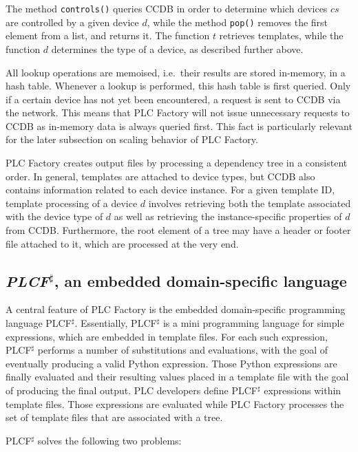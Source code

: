 \documentclass[a4paper,
              ]{jacow}
\begin{document}
The method \texttt{controls()} queries CCDB in order to determine which devices $\mathit{cs}$ are controlled by a given device $d$, while the method \texttt{pop()} removes the first element from a list, and returns it. The function $t$ retrieves templates, while the function $d$ determines the type of a device, as described further above.

All lookup operations are memoised, i.e.\ their results are stored in-memory, in a hash table. Whenever a lookup is performed, this hash table is first queried. Only if a certain device has not yet been encountered, a request is sent to CCDB via the network. This means that PLC Factory will not issue unnecessary requests to CCDB as in-memory data is always queried first. This fact is particularly relevant for the later subsection on scaling behavior of PLC Factory. %

PLC Factory creates output files by processing a dependency tree in a consistent order. In general, templates are attached to device types, but CCDB also contains information related to each device instance. For a given template ID, template processing of a device $d$ involves retrieving both the template associated with the device type of $d$ as well as retrieving the instance-specific properties of $d$ from CCDB. Furthermore, the root element of a tree may have a header or footer file attached to it, which are processed at the very end.

\subsection{\emph{PLCF$^\sharp$}, an embedded domain-specific language}
\label{subsec:plcf}
A central feature of PLC Factory is the embedded domain-specific programming language PLCF$^\sharp$. Essentially, PLCF$^\sharp$ is a mini programming language for simple expressions, which are embedded in template files. For each such expression, PLCF$^\sharp$ performs a number of substitutions and evaluations, with the goal of eventually producing a valid Python expression. Those Python expressions are finally evaluated and their resulting values placed in a template file with the goal of producing the final output. PLC developers define PLCF$^\sharp$ expressions within template files. Those expressions are evaluated while PLC Factory processes the set of template files that are associated with a tree.

PLCF$^\sharp$ solves the following two problems:
\end{document}
